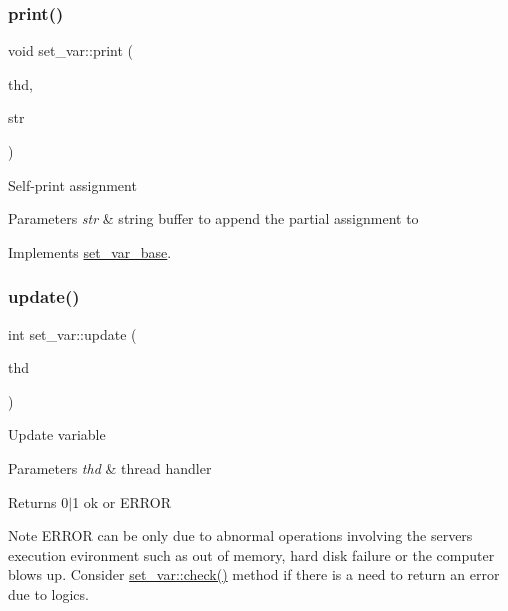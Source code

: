 \mbox{\label{classset__var_ae336aa6a215d69563fba401c45d9ff96}} 
\subsubsection{\texorpdfstring{print()}{print()}}
{\footnotesize\ttfamily void set\+\_\+var\+::print (\begin{DoxyParamCaption}\item[{T\+HD $\ast$}]{thd,  }\item[{String $\ast$}]{str }\end{DoxyParamCaption})\hspace{0.3cm}{\ttfamily [virtual]}}

Self-\/print assignment


\begin{DoxyParams}{Parameters}
{\em str} & string buffer to append the partial assignment to \\
\hline
\end{DoxyParams}


Implements \mbox{\hyperlink{classset__var__base}{set\+\_\+var\+\_\+base}}.

\mbox{\label{classset__var_a442c881d2848fa5da00c6060e91eb2b2}} 
\subsubsection{\texorpdfstring{update()}{update()}}
{\footnotesize\ttfamily int set\+\_\+var\+::update (\begin{DoxyParamCaption}\item[{T\+HD $\ast$}]{thd }\end{DoxyParamCaption})\hspace{0.3cm}{\ttfamily [virtual]}}

Update variable


\begin{DoxyParams}{Parameters}
{\em thd} & thread handler \\
\hline
\end{DoxyParams}
\begin{DoxyReturn}{Returns}
0$\vert$1 ok or E\+R\+R\+OR
\end{DoxyReturn}
\begin{DoxyNote}{Note}
E\+R\+R\+OR can be only due to abnormal operations involving the server\textquotesingle{}s execution evironment such as out of memory, hard disk failure or the computer blows up. Consider \mbox{\hyperlink{classset__var_a9d3bbbfa65cf51f9770ef2bd9c77ddcc}{set\+\_\+var\+::check()}} method if there is a need to return an error due to logics. 
\end{DoxyNote}



